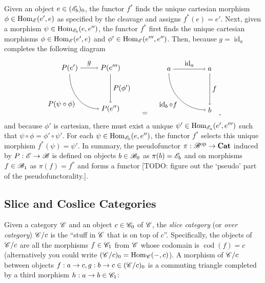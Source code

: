 \documentclass[12pt]{article}
\theoremstyle{definition}
\theoremstyle{remark}
\DeclareMathOperator{\id}{id}
\newcommand{\opcat}{\mathrm{op}}
\DeclareMathOperator{\Hom}{Hom}
\DeclareMathOperator{\cod}{cod}
\begin{document}
Given an object $e \in (\mathscr{E}_b)_0$, the functor $f^{\ast}$ finds the unique cartesian morphism $\phi \in \Hom_{\catE}(e',e)$ as specified by the cleavage and assigns $f^{\ast}(e) = e'$. Next, given a morphism $\psi \in \Hom_{\catE_{b}}(e, e'')$, the functor $f^{\ast}$ first finds the unique cartesian morphisms $\phi \in \Hom_{\catE}(e', e)$ and $\phi' \in \Hom_{\catE}(e''', e'')$. Then, because $g = \id_a$ completes the following diagram
\[
    \begin{tikzpicture}
        \draw (-1,+1) node(tl){$P(e')$};
        \draw (+1,+1) node(tr){$P(e''')$};
        \draw (+1,-1) node(br){$P(e'')$};

        \draw[->] (tl) to node[above]{$g$} (tr);
        \draw[->] (tl) to[out=-90, in=180] node[below left]{$P(\psi\circ\phi)$} (br);
        \draw[->] (tr) to node[right]{$P(\phi')$} (br);
    \end{tikzpicture}
    \quad=\quad
    \begin{tikzpicture}
        \draw (-1,+1) node(tl){$a$};
        \draw (+1,+1) node(tr){$a$};
        \draw (+1,-1) node(br){$b$};

        \draw[->] (tl) to node[above]{$\id_{a}$} (tr);
        \draw[->] (tl) to[out=-90, in=180] node[below left]{$\id_{b} \circ f$} (br);
        \draw[->] (tr) to node[right]{$f$} (br);
    \end{tikzpicture},
\]
and because $\phi'$ is cartesian, there must exist a unique $\psi' \in \Hom_{\catE_a}(e', e''')$ such that $\psi \circ \phi = \phi' \circ \psi'$. For each $\psi \in \Hom_{\catE_b}(e, e'')$, the functor $f^{\ast}$ selects this unique morphism $f^{\ast}(\psi) = \psi'$. In summary, the pseudofunctor $\pi : \catB^{\opcat} \to \mathbf{Cat}$ induced by $P : \mathscr{E} \to \mathscr{B}$ is defined on objects $b \in \mathscr{B}_{0}$ as $\pi(b) = \mathscr{E}_{b}$ and on morphisms $f \in \mathscr{B}_{1}$ as $\pi(f) = f^{\ast}$ and forms a functor \textcolor{red!50!black}{[TODO: figure out the `pseudo' part of the pseudofunctorality.]}.

\subsection{Slice and Coslice Categories}

Given a category $\mathscr{C}$ and an object $c \in \mathscr{C}_0$ of $\mathscr{C}$, the \textit{slice category} (or \textit{over category}) $\mathscr{C}/c$ is the ``stuff in $\mathscr{C}$ that is on top of $c$''. Specifically, the objects of $\mathscr{C}/c$ are all the morphisms $f \in \mathscr{C}_1$ from $\mathscr{C}$ whose codomain is $\cod(f) = c$ (alternatively you could write $(\catC/c)_0 = \Hom_{\catC}(-,c)$). A morphism of $\mathscr{C}/c$ between objects $f : a \to c, g : b \to c \in (\mathscr{C}/c)_0$ is a commuting triangle completed by a third morphism $h : a \to b \in \mathscr{C}_1$:
\end{document}
